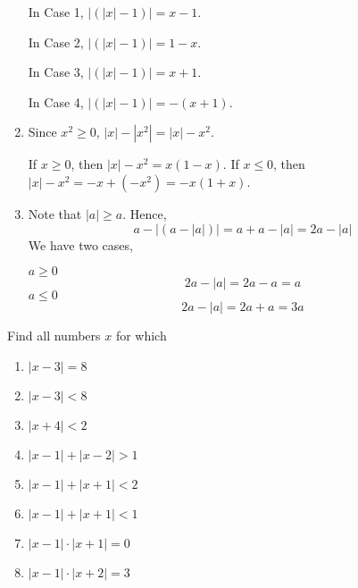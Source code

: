 \begin{solution}
\begin{enumerate}[label=(\roman*)]
    In Case 1, $|(|x|-1)|=x-1$. \par
    In Case 2, $|(|x|-1)|=1-x$. \par
    In Case 3, $|(|x|-1)|=x+1$. \par
    In Case 4, $|(|x|-1)|=-(x+1)$.
    \item Since $x^2\geq0$, $|x|-|x^2|=|x|-x^2$. \par
    If $x\geq0$, then $|x|-x^2=x(1-x)$. If $x\leq0$,
    then\\ $|x|-x^2=-x+(-x^2)=-x(1+x)$.
    \item Note that $|a|\geq a$. Hence,
    \begin{equation*}
      a-|(a-|a|)|=a+a-|a|=2a-|a|
    \end{equation*}
    We have two cases,
    \par
    $a\geq0$
    \begin{equation*}
      2a-|a|=2a-a=a
    \end{equation*}
    $a\leq0$
    \begin{equation*}
      2a-|a|=2a+a=3a
    \end{equation*}
  \end{enumerate}
\end{solution}

\begin{pr}
  Find all numbers $x$ for which
  \begin{enumerate}[label=(\roman*)]
    \item $|x-3|=8$
    \item $|x-3|<8$
    \item $|x+4|<2$
    \item $|x-1|+|x-2|>1$
    \item $|x-1|+|x+1|<2$
    \item $|x-1|+|x+1|<1$
    \item $|x-1|\cdot|x+1|=0$
    \item $|x-1|\cdot|x+2|=3$
  \end{enumerate}
\end{pr}

